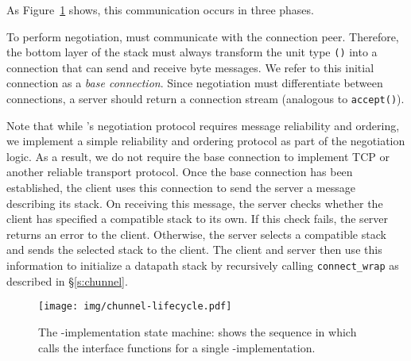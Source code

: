 As Figure~\ref{f:impl-lifecycle} shows, this communication occurs in three phases. 
\begin{outline}
    \1 To perform negotiation, \name must communicate with the connection peer. Therefore, the bottom layer of the \tunnel stack must always transform the unit type \texttt{()} into a connection that can send and receive byte messages. We refer to this initial connection as a \emph{base connection}.
      \2 Since negotiation must differentiate between connections, a \name server should return a connection stream (analogous to \texttt{accept()}).
\end{outline}
Note that while \name's negotiation protocol requires message reliability and ordering, we implement a simple reliability and ordering protocol as part of the negotiation logic. As a result, we do not require the base connection to implement TCP or another reliable transport protocol. 
Once the base connection has been established, the client uses this connection to send the server a message describing its \tunnel stack.  
On receiving this message, the server checks whether the client has specified a compatible \tunnel stack to its own. If this check fails, the server returns an error to the client.  Otherwise, the server selects a compatible \tunnel stack and sends the selected \tunnel stack to the client. The client and server then use this information to initialize a datapath stack by recursively calling \texttt{connect\_wrap} as described in \S\ref{s:chunnel}.

\begin{figure}[t]
    \centering
    \texttt{[image: img/chunnel-lifecycle.pdf]}
    \caption{The \tunnel-implementation state machine: shows the sequence in which \name calls the interface functions for a single \tunnel-implementation. }
    \label{f:impl-lifecycle}
\end{figure}

